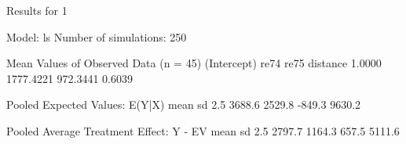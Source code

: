 \begin{enumerate}
\begin{Schunk}
\begin{Soutput}
Results for 1 

  Model: ls 
  Number of simulations: 250 

Mean Values of Observed Data (n = 45) 
(Intercept)        re74        re75    distance 
     1.0000   1777.4221    972.3441      0.6039 

Pooled Expected Values: E(Y|X)
  mean     sd   2.5%  97.5% 
3688.6 2529.8 -849.3 9630.2 

Pooled Average Treatment Effect: Y - EV
  mean     sd   2.5%  97.5% 
2797.7 1164.3  657.5 5111.6 


\end{Soutput}
\end{Schunk}
  
\end{enumerate}

